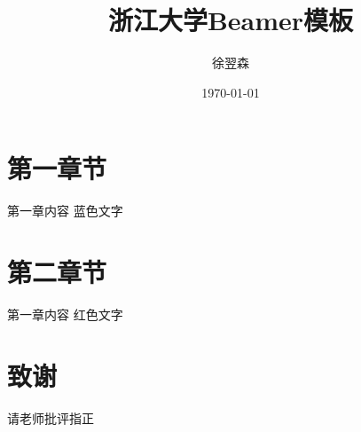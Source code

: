 \documentclass[aspectratio=169]{beamer} %
\title{浙江大学Beamer模板}
\author{徐翌森}
\institute{系统5班}
\date{\today}
\begin{document}
\begin{frame}
    \titlepage
    \vspace{-0.5cm}
    \begin{figure}[h]
        \centering
    \end{figure}
\end{frame}

\section{第一章节}

\begin{frame}{第一章内容}
    \textcolor{zju_blue}{蓝色文字}
\end{frame}

\section{第二章节}

\begin{frame}{第一章内容}
    \textcolor{zju_red}{红色文字}
\end{frame}

\appendix

\section*{致谢}

\begin{frame}
    \begin{center}
        \vspace{1cm}
        \hrulefill 
        \hrulefill

        \vspace{1cm}

        {\Large 请老师批评指正}
    \end{center}
\end{frame} 
\end{document}
